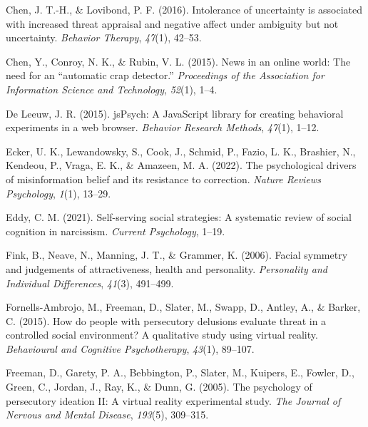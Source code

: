 \documentclass[
  man,floatsintext]{apa6}
\newlength{\cslhangindent}
\newlength{\cslentryspacingunit} %
\newenvironment{CSLReferences}[2] %
 {%
  \setlength{\parindent}{0pt}
  \ifodd #1
  \let\oldpar\par
  \def\par{\hangindent=\cslhangindent\oldpar}
  \fi
  \setlength{\parskip}{#2\cslentryspacingunit}
 }%
 {}
\begin{document}
\begin{CSLReferences}{1}{0}
\leavevmode{}%
Chen, J. T.-H., \& Lovibond, P. F. (2016). Intolerance of uncertainty is associated with increased threat appraisal and negative affect under ambiguity but not uncertainty. \emph{Behavior Therapy}, \emph{47}(1), 42--53.

\leavevmode{}%
Chen, Y., Conroy, N. K., \& Rubin, V. L. (2015). News in an online world: The need for an {``automatic crap detector.''} \emph{Proceedings of the Association for Information Science and Technology}, \emph{52}(1), 1--4.

\leavevmode{}%
De Leeuw, J. R. (2015). jsPsych: A JavaScript library for creating behavioral experiments in a web browser. \emph{Behavior Research Methods}, \emph{47}(1), 1--12.

\leavevmode{}%
Ecker, U. K., Lewandowsky, S., Cook, J., Schmid, P., Fazio, L. K., Brashier, N., Kendeou, P., Vraga, E. K., \& Amazeen, M. A. (2022). The psychological drivers of misinformation belief and its resistance to correction. \emph{Nature Reviews Psychology}, \emph{1}(1), 13--29.

\leavevmode{}%
Eddy, C. M. (2021). Self-serving social strategies: A systematic review of social cognition in narcissism. \emph{Current Psychology}, 1--19.

\leavevmode{}%
Fink, B., Neave, N., Manning, J. T., \& Grammer, K. (2006). Facial symmetry and judgements of attractiveness, health and personality. \emph{Personality and Individual Differences}, \emph{41}(3), 491--499.

\leavevmode{}%
Fornells-Ambrojo, M., Freeman, D., Slater, M., Swapp, D., Antley, A., \& Barker, C. (2015). How do people with persecutory delusions evaluate threat in a controlled social environment? A qualitative study using virtual reality. \emph{Behavioural and Cognitive Psychotherapy}, \emph{43}(1), 89--107.

\leavevmode{}%
Freeman, D., Garety, P. A., Bebbington, P., Slater, M., Kuipers, E., Fowler, D., Green, C., Jordan, J., Ray, K., \& Dunn, G. (2005). The psychology of persecutory ideation II: A virtual reality experimental study. \emph{The Journal of Nervous and Mental Disease}, \emph{193}(5), 309--315.


\end{CSLReferences}
\end{document}
